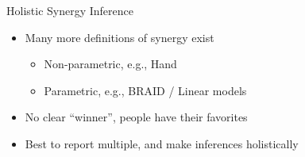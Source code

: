 \documentclass{beamer}
\begin{document}
\begin{frame}{Holistic Synergy Inference}
    \begin{itemize}
        \item Many more definitions of synergy exist \begin{itemize}
            \item Non-parametric, e.g., Hand 
            \item Parametric, e.g., BRAID / Linear models
        \end{itemize}
        \item No clear ``winner'', people have their favorites
        \item Best to report multiple, and make inferences holistically
    \end{itemize}
\end{frame}
    
\end{document}
